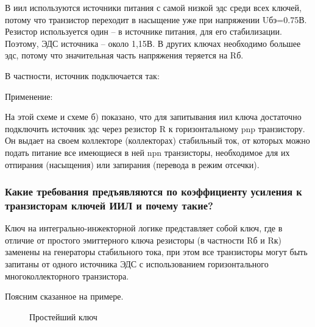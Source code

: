 В иил используются источники питания с самой низкой эдс среди всех ключей, потому что транзистор переходит в насыщение уже при напряжении Uбэ=0.75В. Резистор используется один -- в источнике питания, для его стабилизации. Поэтому, ЭДС источника -- около 1,15В. В других ключах необходимо большее эдс, потому что значительная часть напряжения теряется на Rб.

В частности, источник подключается так:

\begin{center}
	\begin{figure}[h!]
		\caption{}	
		\label{iil5}
	\end{figure}
\end{center}



Применение:
\begin{center}
	\begin{figure}[h!]
		\caption{}	
		\label{iil7}
	\end{figure}
\end{center}

На этой схеме и схеме б) показано, что для запитывания иил ключа достаточно подключить источник эдс через резистор R к горизонтальному pnp транзистору. Он выдает на своем коллекторе (коллекторах) стабильный ток, от которых можно подать питание все имеющиеся в ней npn транзисторы, необходимое для их отпирания (насыщения) или запирания (перевода в режим отсечки).

\subsubsection{Какие требования предъявляются по коэффициенту усиления к транзисторам ключей ИИЛ и почему такие?}

Ключ на интегрально-инжекторной логике представляет собой ключ, где в отличие от простого эмиттерного ключа резисторы (в частности Rб и Rк) заменены на генераторы стабильного тока, при этом все транзисторы могут быть запитаны от одного источника ЭДС с использованием горизонтального многоколлекторного транзистора.

Поясним сказанное на примере.

\begin{center}
	\begin{figure}[h!]
		\caption{Простейший ключ}	
		\label{iil1}
	\end{figure}
\end{center}

